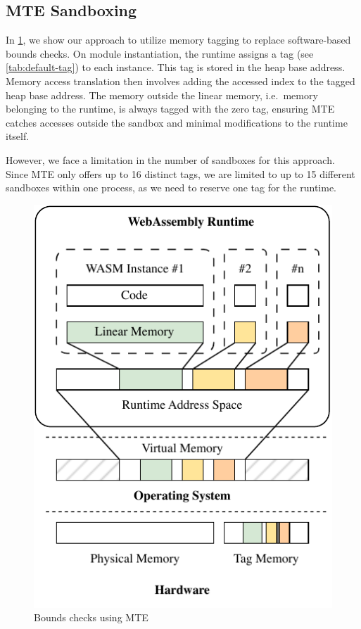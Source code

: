 \subsection{\ac{MTE} Sandboxing}
\label{subsec:bounds-checks}

In \cref{fig:system-design-sandboxing}, we show our approach to utilize memory tagging to replace software-based bounds checks.
On module instantiation, the runtime assigns a tag (see \cref{tab:default-tag}) to each instance.
This tag is stored in the heap base address.
Memory access translation then involves adding the accessed index to the tagged heap base address.
The memory outside the linear memory, i.e.\ memory belonging to the runtime, is always tagged with the zero tag, ensuring \ac{MTE} catches accesses outside the sandbox and minimal modifications to the runtime itself.

However, we face a limitation in the number of sandboxes for this approach.
Since \ac{MTE} only offers up to 16 distinct tags, we are limited to up to 15 different sandboxes within one process, as we need to reserve one tag for the runtime.

\begin{figure}[t]
  \centering
  \includegraphics[scale=1]{figures/build/system-design-1}
  \caption{Bounds checks using \ac{MTE}}
  \label{fig:system-design-sandboxing}
\end{figure}

